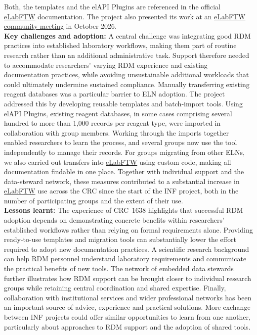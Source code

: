 \documentclass{eceasst}
\newcommand{\elabftw}{\href{https://www.elabftw.net/}{eLabFTW}}
\begin{document}
Both, the templates and the elAPI Plugins are referenced
in the official \elabftw{} documentation.
The project also presented its work at an
\href{https://www.deltablot.com/posts/community-meetings/community-meeting-20261001/}
{\elabftw{} community meeting} in October 2026.
\\
\noindent\textbf{Key challenges and adoption:}
A central challenge was integrating good RDM practices into
established laboratory workflows, making them part of routine
research rather than an additional administrative task.
Support therefore needed to accommodate researchers' varying
RDM experience and existing documentation practices, while
avoiding unsustainable additional workloads that could
ultimately undermine sustained compliance.
Manually transferring existing reagent databases was a
particular barrier to ELN adoption.
The project addressed this by developing reusable templates
and batch-import tools.
Using elAPI Plugins, existing reagent databases, in some cases
comprising several hundred to more than 1,000 records per
reagent type, were imported in collaboration with group
members.
Working through the imports together enabled researchers to
learn the process, and several groups now use the tool
independently to manage their records.
For groups migrating from other ELNs, we also carried out
transfers into \elabftw{} using custom code, making all
documentation findable in one place.
Together with individual support and the data-steward network,
these measures contributed to a substantial increase in
\elabftw{} use across the CRC since the start of the INF
project, both in the number of participating groups and the
extent of their use.
\\
\noindent\textbf{Lessons learnt:}
The experience of CRC~1638 highlights that successful RDM
adoption depends on demonstrating concrete benefits within
researchers' established workflows rather than relying on
formal requirements alone.
Providing ready-to-use templates and migration tools can
substantially lower the effort required to adopt new
documentation practices.
A scientific research background can help RDM personnel
understand laboratory requirements and communicate the
practical benefits of new tools.
The network of embedded data stewards further illustrates
how RDM support can be brought closer to individual research
groups while retaining central coordination and shared
expertise.
Finally, collaboration with institutional services and
wider professional networks has been an important source of
advice, experience and practical solutions.
More exchange between INF projects could offer similar
opportunities to learn from one another, particularly about
approaches to RDM support and the adoption of shared tools.
\end{document}
